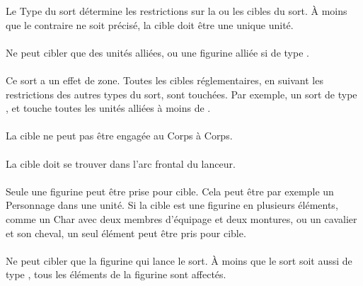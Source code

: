 Le Type du sort détermine les restrictions sur la ou les cibles du sort. À moins que le contraire ne soit précisé, la cible doit être une unique unité.

\paragraph{\augment}

Ne peut cibler que des unités alliées, ou une figurine alliée si de type \focused{}.

\paragraph{\aura}

Ce sort a un effet de zone. Toutes les cibles réglementaires, en suivant les restrictions des autres types du sort, sont touchées. Par exemple, un sort de type \aura{}, \augment{} et  touche toutes les unités alliées à moins de .

\paragraph{\damage}

La cible ne peut pas être engagée au Corps à Corps.

\paragraph{\direct}

La cible doit se trouver dans l'arc frontal du lanceur.

\paragraph{\focused}

Seule une figurine peut être prise pour cible. Cela peut être par exemple un Personnage dans une unité. Si la cible est une figurine en plusieurs éléments, comme un Char avec deux membres d'équipage et deux montures, ou un cavalier et son cheval, un seul élément peut être pris pour cible.

\paragraph{\caster}

Ne peut cibler que la figurine qui lance le sort. À moins que le sort soit aussi de type \focused{}, tous les éléments de la figurine sont affectés.


